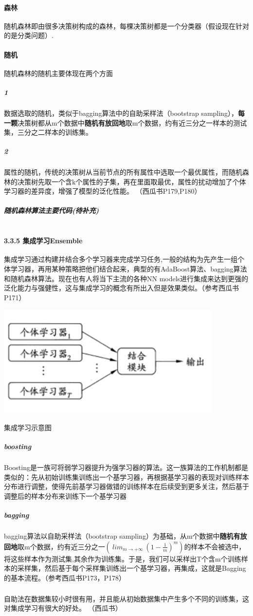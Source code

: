 \documentclass[UTF8]{article}
\begin{document}
 \paragraph{森林}随机森林即由很多决策树构成的森林，每棵决策树都是一个分类器（假设现在针对的是分类问题）.
 \paragraph{随机}随机森林的随机主要体现在两个方面
 \subparagraph{1}数据选取的随机，类似于bagging算法中的自助采样法（bootstrap sampling），\textbf{每一颗}决策树都从m个数据中\textbf{随机有放回地}取m个数据，约有近三分之一样本的测试集，三分之二样本的训练集。
 \subparagraph{2}属性的随机，传统的决策树从当前节点的所有属性中选取一个最优属性，而随机森林的决策树先取一个含k个属性的子集，再在里面取最优，属性的扰动增加了个体学习器的差异度，增强了模型的泛化性能。
 （西瓜书P179,P180）




 \subparagraph{随机森林算法主要代码(待补充)}

 \lstset{language=python}
 \begin{lstlisting}
 \end{lstlisting}

\paragraph{\large 3.3.5 集成学习Ensemble}
集成学习通过构建并结合多个学习器来完成学习任务,一般的结构为先产生一组个体学习器，再用某种策略把他们结合起来，典型的有AdaBoost算法、bagging算法和随机森林算法。现在也有人将当下主流的各种NN models进行集成来达到更强的泛化能力与强健性，这与集成学习的概念有所出入但是效果类似。（参考西瓜书P171）
\begin{center}
\includegraphics[width=0.8\linewidth]{5.PNG}
\end{center}
\centerline{集成学习示意图}
\subparagraph{boosting}Boosting是一族可将弱学习器提升为强学习器的算法。这一族算法的工作机制都是类似的：先从初始训练集训练出一个基学习器，再根据基学习器的表现对训练样本分布进行调整，使得先前基学习器做错的训练样本在后续受到更多关注，然后基于调整后的样本分布来训练下一个基学习器
\subparagraph{bagging}bagging算法以自助采样法（bootstrap sampling）为基础，从m个数据中\textbf{随机有放回地}取m个数据，约有近三分之一$(\ lim_ {m \to + \infty} \ (1 - \frac{1}{m})^m)$的样本不会被选中，将这些样本作为测试集,其余作为训练集。于是，我们可以采样出T个含m个训练样本的采样集，然后基于每个采样集训练出一个基学习器，再集成，这就是Bagging的基本流程。（参考西瓜书P173，P178）
\subparagraph{}自助法在数据集较小时很有用，并且能从初始数据集中产生多个不同的训练集，这对集成学习有很大的好处。 （西瓜书）
\end{document}
